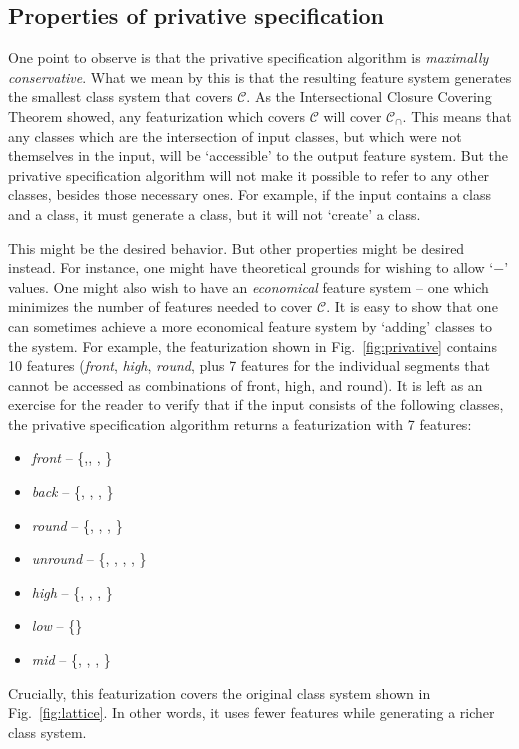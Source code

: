 \documentclass[11pt, oneside]{article}   	%
\begin{document}
\subsection{Properties of privative specification}

One point to observe is that the privative specification algorithm is \textit{maximally conservative}. What we mean by this is that the resulting feature system generates the smallest class system that covers $\mathcal C$. As the Intersectional Closure Covering Theorem showed, any featurization which covers $\mathcal C$ will cover $\mathcal C_\cap$. This means that any classes which are the intersection of input classes, but which were not themselves in the input, will be `accessible' to the output feature system. But the privative specification algorithm will not make it possible to refer to any other classes, besides those necessary ones. For example, if the input contains a  class and a  class, it must generate a  class, but it will not `create' a  class.

This might be the desired behavior. But other properties might be desired instead. For instance, one might have theoretical grounds for wishing to allow `$-$' values. One might also wish to have an \textit{economical} feature system -- one which minimizes the number of features needed to cover $\mathcal C$. It is easy to show that one can sometimes achieve a more economical  feature system by `adding' classes to the system. For example, the featurization shown in Fig.~\ref{fig:privative} contains 10 features (\textit{front}, \textit{high}, \textit{round}, plus 7 features for the individual segments that cannot be accessed as combinations of front, high, and round). It is left as an exercise for the reader to verify that if the input consists of the following classes, the privative specification algorithm returns a featurization with 7 features: \begin{itemize}
    \item \textit{front} -- \{,, , \textipa{\oe}\}
    \item \textit{back} -- \{, , , \}
    \item \textit{round} -- \{, , \textipa{\oe}, \}
    \item \textit{unround} --  \{, , , , \}
    \item \textit{high} --  \{, , , \}
    \item \textit{low} -- \{\}
    \item \textit{mid} --  \{, \textipa{\oe}, , \}
    \end{itemize}
Crucially, this featurization covers the original class system shown in Fig.~\ref{fig:lattice}. In other words, it uses fewer features while generating a richer class system.
\end{document}
